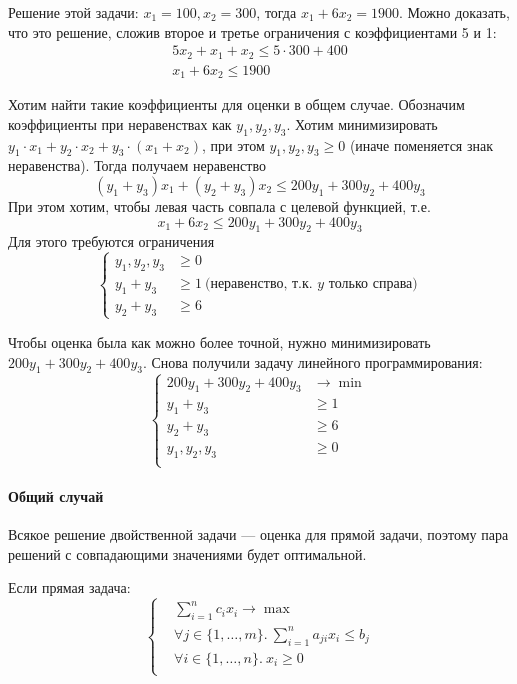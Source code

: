 Решение этой задачи:
$x_1 = 100, x_2 = 300$,
тогда $x_1 + 6 x_2 = 1900$.
Можно доказать, что это решение, сложив
второе и третье ограничения с коэффициентами 5 и 1:
\begin{gather*}
    5 x_2 + x_1 + x_2 \le 5 \cdot 300 + 400 \\
    x_1 + 6 x_2 \le 1900
\end{gather*}

Хотим найти такие коэффициенты для оценки в общем случае.
Обозначим коэффициенты при неравенствах
как $y_1, y_2, y_3$.
Хотим минимизировать
$y_1 \cdot x_1 + y_2 \cdot x_2 + y_3 \cdot (x_1 + x_2)$,
при этом $y_1, y_2, y_3 \ge 0$
(иначе поменяется знак неравенства).
Тогда получаем неравенство
\[
    (y_1 + y_3) x_1 + (y_2 + y_3) x_2 \le 200 y_1 + 300 y_2 + 400 y_3
\]
При этом хотим, чтобы левая часть совпала с целевой функцией,
т.е.
\[
    x_1 + 6 x_2 \le 200 y_1 + 300 y_2 + 400 y_3
\]
Для этого требуются ограничения
\[
    \left\{
    \begin{aligned}
        y_1, y_2, y_3 & \ge 0 \\
        y_1 + y_3 & \ge 1~\text{(неравенство, т.к. $y$ только справа)} \\
        y_2 + y_3 & \ge 6
    \end{aligned}
    \right.
\]

Чтобы оценка была как можно более точной,
нужно минимизировать $200 y_1 + 300 y_2 + 400 y_3$.
Снова получили задачу линейного программирования:
\[
    \left\{
    \begin{aligned}
        200 y_1 + 300 y_2 + 400 y_3 & \to \min \\
        y_1 + y_3 & \ge 1 \\
        y_2 + y_3 & \ge 6 \\
        y_1, y_2, y_3 & \ge 0 \\
    \end{aligned}
    \right.
\]

\paragraph{Общий случай}
Всякое решение двойственной задачи
--- оценка для прямой задачи,
поэтому пара решений с совпадающими
значениями будет оптимальной.

Если прямая задача:
\[
    \left\{
    \begin{aligned}
        & \sum_{i=1}^n c_i x_i \to \max \\
        & \forall j \in \{1, \ldots, m\}.~\sum_{i=1}^n a_{ji} x_i \le b_j \\
        & \forall i \in \{1, \ldots, n\}.~x_i \ge 0 \\
    \end{aligned}
    \right.
\]

